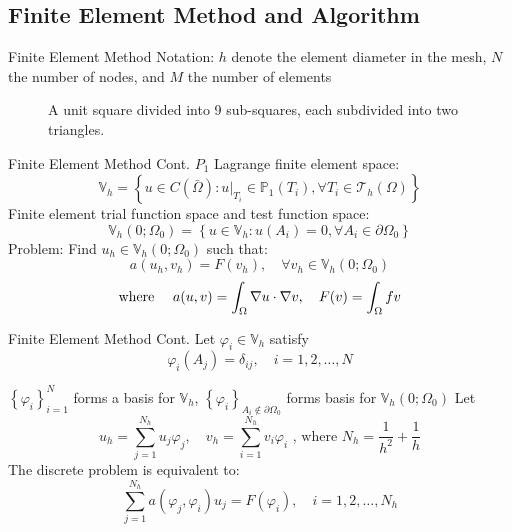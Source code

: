 \documentclass{beamer}
\begin{document}
\subsection{Finite Element Method and Algorithm}
\begin{frame}{Finite Element Method}
Notation: $h$ denote the element diameter in the mesh, $N$ the number of nodes, and $M$ the number of elements
    \begin{figure}[h]
    \centering
    \caption{A unit square divided into 9 sub-squares, each subdivided into two triangles.}
    \label{fig:mesh}
\end{figure}
\end{frame}
\begin{frame}{Finite Element Method Cont.}
$P_1$ Lagrange finite element space: $$
\mathbb{V}_{h}=\left\{u \in C(\bar{\Omega}): \left.u\right|_{T_{i}} \in \mathbb{P}_{1}\left(T_{i}\right), \forall T_{i} \in \mathcal{T}_{h}(\Omega)\right\}
$$
\pause 
Finite element trial function space and test function space:
$$
\mathbb{V}_{h}\left(0 ; \Omega_{0}\right)=\left\{u \in \mathbb{V}_{h}: u\left(A_{i}\right)=0, \forall A_{i} \in \partial \Omega_{0}\right\}
$$
\pause
Problem:
Find \( u_h \in \mathbb{V}_h(0; \Omega_0) \) such that:
\[
a(u_h, v_h) = F(v_h), \quad \forall v_h \in \mathbb{V}_h(0; \Omega_0)
\]
$$\text{where \quad}
a(u, v)=\int_{\Omega} \nabla u \cdot \nabla v, \quad F(v)=\int_{\Omega} f v
$$    
\end{frame}

\begin{frame}{Finite Element Method Cont.}
Let $\varphi_{i} \in \mathbb{V}_{h}$ satisfy
$$
\varphi_{i}\left(A_{j}\right)=\delta_{i j}, \quad i=1,2, \dots, N
$$

$\left\{\varphi_{i}\right\}_{i=1}^{N}$ forms a basis for $\mathbb{V}_{h}$, $\left\{\varphi_{i}\right\}_{A_{i} \notin \partial \Omega_{0}}$ forms basis for $\mathbb{V}_{h}\left(0 ; \Omega_{0}\right)$
\pause
Let
$$
u_{h}=\sum_{j=1}^{N_{h}} u_{j} \varphi_{j}, \quad v_{h}=\sum_{i=1}^{N_{h}} v_{i} \varphi_{i}\text{ , where }N_{h}=\frac{1}{h^{2}}+\frac{1}{h}
$$
The discrete problem is equivalent to:
$$
\sum_{j=1}^{N_{h}} a\left(\varphi_{j}, \varphi_{i}\right) u_{j}=F\left(\varphi_{i}\right), \quad i=1,2, \dots, N_{h}
$$
\end{frame}
\end{document}
